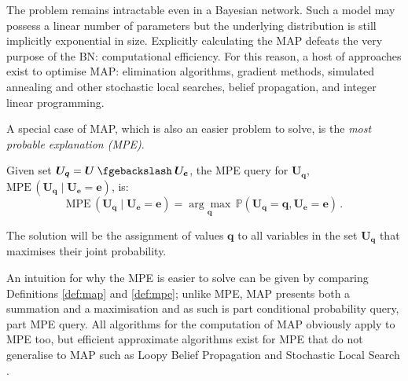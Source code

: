 The problem remains intractable even in a Bayesian network.  
Such a model may possess a linear number of parameters but the underlying distribution is still implicitly exponential in size.
Explicitly calculating the MAP defeats the very purpose of the BN: computational efficiency.
For this reason, a host of approaches exist to optimise MAP: elimination algorithms, gradient methods, simulated annealing and other stochastic local searches, belief propagation, and integer linear programming.

A special case of MAP, which is also an easier problem to solve, is the \textit{most probable explanation (MPE)}.
\begin{definition}  \label{def:mpe}
 Given set $ \boldsymbol{U_q}= \boldsymbol{U} \mysetminus \boldsymbol{U_e}$, the MPE query for $\boldsymbol{U_q}$, $\text{MPE}\,( \boldsymbol{U_q}\mid \boldsymbol{U_e}=\boldsymbol{e} )$, is:
	\begin{equation*} 
		\text{MPE}\,( \boldsymbol{U_q} \mid \boldsymbol{U_e}=\boldsymbol{e} ) = \underset{\boldsymbol{q}}{\arg\max}\, \mathbb{P}(\boldsymbol{U_q}=\boldsymbol{q} , \boldsymbol{U_e}=\boldsymbol{e}) \,.
	\end{equation*}
\end{definition}
The solution will be the assignment of values $\boldsymbol{q}$ to all variables in the set $\boldsymbol{U_q}$ that maximises their joint probability.

An intuition for why the MPE is easier to solve can be given by comparing Definitions \ref{def:map} and \ref{def:mpe}; unlike MPE, MAP presents both a summation and a maximisation and as such is part conditional probability query, part MPE query.
All algorithms for the computation of MAP obviously apply to MPE too, but efficient approximate algorithms exist for MPE that do not generalise to MAP such as Loopy Belief Propagation \citep{Pearl1988} and Stochastic Local Search \citep{Kask1999}.